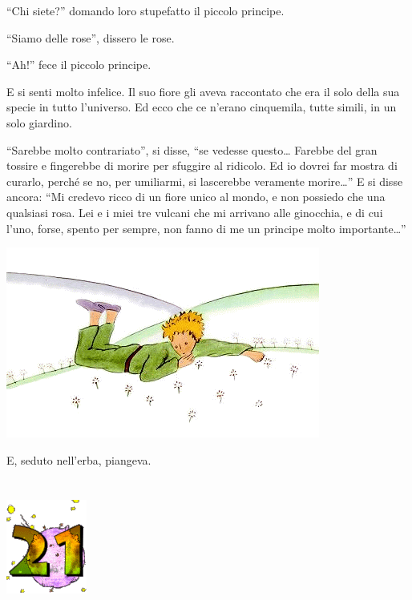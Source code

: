 \documentclass[11pt]{scrbook}
\begin{document}
``Chi siete?'' domando loro stupefatto il piccolo principe.

``Siamo delle rose'', dissero le rose.

``Ah!'' fece il piccolo principe.

E si senti molto infelice. Il suo fiore gli aveva raccontato che era il
solo della sua specie in tutto l'universo. Ed ecco che ce n'erano
cinquemila, tutte simili, in un solo giardino.

``Sarebbe molto contrariato'', si disse, ``se vedesse questo\ldots{}
Farebbe del gran tossire e fingerebbe di morire per sfuggire al
ridicolo. Ed io dovrei far mostra di curarlo, perché se no, per
umiliarmi, si lascerebbe veramente morire\ldots{}'' E si disse ancora:
``Mi credevo ricco di un fiore unico al mondo, e non possiedo che una
qualsiasi rosa. Lei e i miei tre vulcani che mi arrivano alle ginocchia,
e di cui l'uno, forse, spento per sempre, non fanno di me un principe
molto importante\ldots{}''

\begin{center}
\includegraphics{./img/20b.png}
\end{center}

E, seduto nell'erba, piangeva.

\chapter{}
\begin{center}
\includegraphics{./img/chapter21.png}
\end{center}
\end{document}
